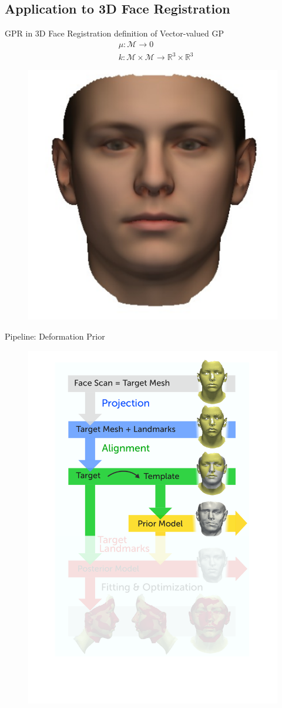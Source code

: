 \documentclass[xcolor=x11names,compress]{beamer}
\begin{document}
\subsection{Application to 3D Face Registration}
\begin{frame}{GPR in 3D Face Registration}
definition of Vector-valued GP
\begin{align*}
    & \mu: \mathcal{M} \rightarrow 0\\
    & k: \mathcal{M} \times \mathcal{M} \rightarrow \mathbb{R}^3 \times \mathbb{R}^3
\end{align*}
 \begin{figure}
        \centering
        \includegraphics[width=.5\textwidth]{../resources/img/mean_msh.pdf}
    \end{figure}
\end{frame}

\begin{frame}{Pipeline: Deformation Prior}
\begin{figure}   
\centering
\includegraphics[width=.6\textwidth]{../resources/figures/pipeline_prior.pdf}
\end{figure}
\end{frame}
\end{document}
